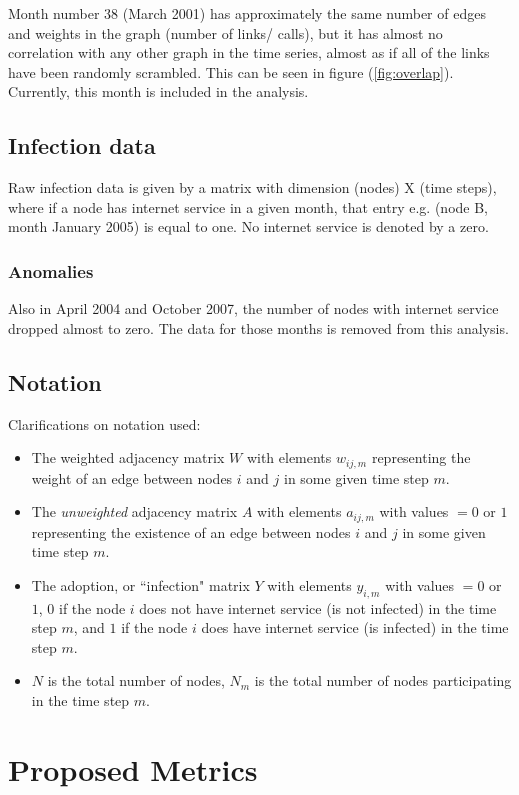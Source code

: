 \documentclass[12pt]{article}
\begin{document}
Month number 38 (March 2001) has approximately the same number of edges and weights in the graph (number of links/ calls), but it has almost no correlation with any other graph in the time series, almost as if all of the links have been randomly scrambled. This can be seen in figure (\ref{fig:overlap}). Currently, this month is included in the analysis.

\subsection{Infection data}
Raw infection data is given by a matrix with dimension (nodes) X (time steps), where if a node has internet service in a given month, that entry e.g. (node B, month January 2005) is equal to one. No internet service is denoted by a zero.

\subsubsection{Anomalies}
Also in April 2004 and October 2007, the number of nodes with internet service dropped almost to zero. The data for those months is removed from this analysis.

\subsection{Notation}
Clarifications on notation used:
\begin{itemize}
\item The weighted adjacency matrix \(W\) with elements \(w_{ij,m}\) representing the weight of an edge between nodes \(i\) and \(j\) in some given time step \(m\).
\item The \emph{unweighted} adjacency matrix \(A\) with elements \(a_{ij,m} \) with values \(= 0\) or \(1\) representing the existence of an edge between nodes \(i\) and \(j\) in some given time step \(m\).
\item The adoption, or ``infection" matrix \(Y\) with elements \(y_{i,m}\) with values \(= 0\) or \(1\), \(0\) if the node \(i\) does not have internet service (is not infected) in the time step \(m\), and \(1\) if the node \(i\) does have internet service (is infected) in the time step \(m\).
\item \(N\) is the total number of nodes, \(N_m\) is the total number of nodes participating in the time step \(m\). 
\end{itemize}

\section{Proposed Metrics}
\end{document}
